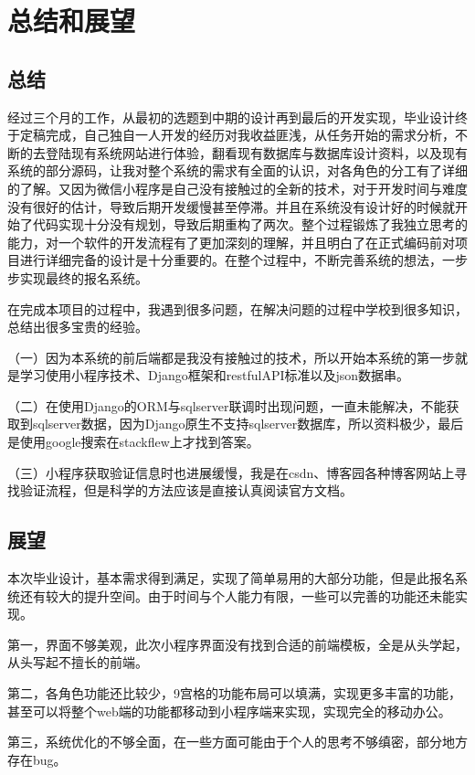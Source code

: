\documentclass[a4paper]{ltxdoc}
\begin{document}
{		%
		
		\section{总结和展望}
		\subsection{总结}
		经过三个月的工作，从最初的选题到中期的设计再到最后的开发实现，毕业设计终于定稿完成，自己独自一人开发的经历对我收益匪浅，从任务开始的需求分析，不断的去登陆现有系统网站进行体验，翻看现有数据库与数据库设计资料，以及现有系统的部分源码，让我对整个系统的需求有全面的认识，对各角色的分工有了详细的了解。又因为微信小程序是自己没有接触过的全新的技术，对于开发时间与难度没有很好的估计，导致后期开发缓慢甚至停滞。并且在系统没有设计好的时候就开始了代码实现十分没有规划，导致后期重构了两次。整个过程锻炼了我独立思考的能力，对一个软件的开发流程有了更加深刻的理解，并且明白了在正式编码前对项目进行详细完备的设计是十分重要的。在整个过程中，不断完善系统的想法，一步步实现最终的报名系统。
		
		在完成本项目的过程中，我遇到很多问题，在解决问题的过程中学校到很多知识，总结出很多宝贵的经验。
		
		（一）因为本系统的前后端都是我没有接触过的技术，所以开始本系统的第一步就是学习使用小程序技术、Django框架和restfulAPI标准以及json数据串。
		
		（二）在使用Django的ORM与sqlserver联调时出现问题，一直未能解决，不能获取到sqlserver数据，因为Django原生不支持sqlserver数据库，所以资料极少，最后是使用google搜索在stackflew上才找到答案。
		
		（三）小程序获取验证信息时也进展缓慢，我是在csdn、博客园各种博客网站上寻找验证流程，但是科学的方法应该是直接认真阅读官方文档。
		
		\subsection{展望}
		
		本次毕业设计，基本需求得到满足，实现了简单易用的大部分功能，但是此报名系统还有较大的提升空间。由于时间与个人能力有限，一些可以完善的功能还未能实现。
		
		第一，界面不够美观，此次小程序界面没有找到合适的前端模板，全是从头学起，从头写起不擅长的前端。
		
		第二，各角色功能还比较少，9宫格的功能布局可以填满，实现更多丰富的功能，甚至可以将整个web端的功能都移动到小程序端来实现，实现完全的移动办公。
	
		第三，系统优化的不够全面，在一些方面可能由于个人的思考不够缜密，部分地方存在bug。
	}
	
\end{document}

